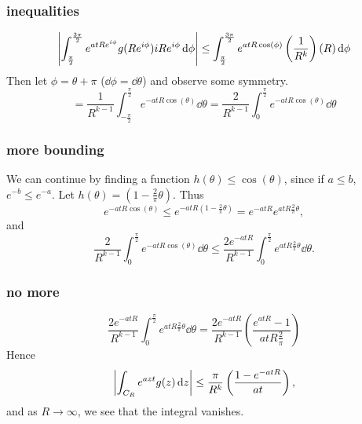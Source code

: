 \documentclass[mathserif]{beamer}
\newcommand{\br}[1]{\left(#1\right)}
\begin{document}
\begin{frame}
  \frametitle{inequalities}

  \[\abs{\int_{\frac{\pi}{2}}^{\frac{3\pi}{2}}e^{atRe^{i\phi}}g(Re^{i\phi})iRe^{i\phi}\dd{\phi}}\leq \int_{\frac{\pi}{2}}^{\frac{3\pi}{2}} e^{atR\cos(\phi)}\br{\frac{1}{R^{k}}}(R)\dd{\phi}\] Then let $\phi = \theta + \pi$ ($\dd{\phi} = \dd{\theta}$) and observe some symmetry. \[ = \frac{1}{R^{k-1}}\int_{-\frac{\pi}{2}}^{\frac{\pi}{2}}e^{-atR\cos(\theta)}\dd{\theta} = \frac{2}{R^{k-1}}\int_{0}^{\frac{\pi}{2}}e^{-atR\cos(\theta)}\dd{\theta}\]

\end{frame}

\begin{frame}
  \frametitle{more bounding}

  We can continue by finding a function $h(\theta)\leq \cos(\theta)$, since if $a\leq b$, $e^{-b}\leq e^{-a}$. Let $h(\theta) = \br{1-\frac{2}{\pi}\theta}$. Thus \[e^{-atR\cos(\theta)} \leq e^{-atR\br{1-\frac{2}{\pi}\theta}} = e^{-atR}e^{atR\frac{2}{\pi}\theta},\] and \[\frac{2}{R^{k-1}}\int_{0}^{\frac{\pi}{2}}e^{-atR\cos(\theta)}\dd{\theta}\leq \frac{2e^{-atR}}{R^{k-1}}\int_{0}^{\frac{\pi}{2}}e^{atR\frac{2}{\pi}\theta}\dd{\theta}.\]

\end{frame}

\begin{frame}
  \frametitle{no more}

  \[\frac{2e^{-atR}}{R^{k-1}}\int_{0}^{\frac{\pi}{2}}e^{atR\frac{2}{\pi}\theta}\dd{\theta} = \frac{2e^{-atR}}{R^{k-1}}\br{\frac{e^{atR}-1}{atR\frac{2}{\pi}}}\]
  Hence \[\abs{\int_{C_R}e^{azt}g(z)\dd{z}}\leq \frac{\pi}{R^{k}}\br{\frac{1-e^{-atR}}{at}},\] and as $R\to \infty$, we see that the integral vanishes.

\end{frame}
\end{document}
